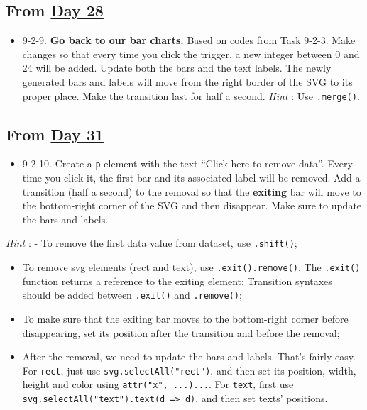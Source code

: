 \documentclass[
]{book}
\providecommand{\tightlist}{%
  \setlength{\itemsep}{0pt}\setlength{\parskip}{0pt}}
\begin{document}
\hypertarget{from-day-28}{%
\subsection{\texorpdfstring{From \href{https://observablehq.com/@hongtaoh/day-twenty-eight-task-9-2-continued-2020-09-21}{Day 28}}{From Day 28}}\label{from-day-28}}

\begin{itemize}
\tightlist
\item
  9-2-9. \textbf{Go back to our bar charts.} Based on codes from Task 9-2-3. Make changes so that every time you click the trigger, a new integer between 0 and 24 will be added. Update both the bars and the text labels. The newly generated bars and labels will move from the right border of the SVG to its proper place. Make the transition last for half a second. \emph{Hint} : Use \texttt{.merge()}.
\end{itemize}

\hypertarget{from-day-31}{%
\subsection{\texorpdfstring{From \href{https://observablehq.com/@hongtaoh/day-31-2020-09-24}{Day 31}}{From Day 31}}\label{from-day-31}}

\begin{itemize}
\tightlist
\item
  9-2-10. Create a \texttt{p} element with the text ``Click here to remove data''. Every time you click it, the first bar and its associated label will be removed. Add a transition (half a second) to the removal so that the \textbf{exiting} bar will move to the bottom-right corner of the SVG and then disappear. Make sure to update the bars and labels.
\end{itemize}

\emph{Hint} :
- To remove the first data value from dataset, use \texttt{.shift()};

\begin{itemize}
\item
  To remove svg elements (rect and text), use \texttt{.exit().remove()}. The \texttt{.exit()} function returns a reference to the exiting element; Transition syntaxes should be added between \texttt{.exit()} and \texttt{.remove()};
\item
  To make sure that the exiting bar moves to the bottom-right corner before disappearing, set its position after the transition and before the removal;
\item
  After the removal, we need to update the bars and labels. That's fairly easy. For \texttt{rect}, just use \texttt{svg.selectAll("rect")}, and then set its position, width, height and color using \texttt{attr("x",\ ...)...}. For \texttt{text}, first use \texttt{svg.selectAll("text").text(d\ =\textgreater{}\ d)}, and then set texts' positions.
\end{itemize}
\end{document}
